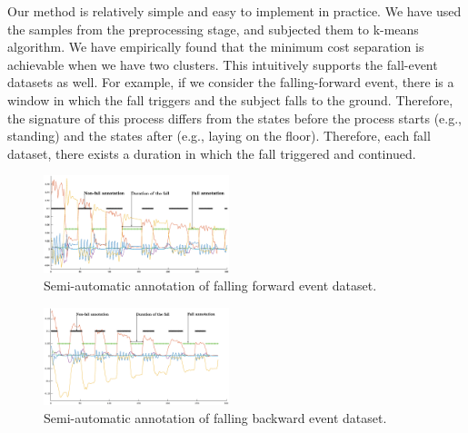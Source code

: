 \documentclass[]{IEEEtran}
\begin{document}
Our method is relatively simple and easy to implement in practice. We have used the 
samples from the preprocessing stage, and subjected them to k-means algorithm. We have empirically found that the minimum cost separation is 
achievable when we have two clusters. This intuitively supports the fall-event datasets 
as well. For 
example, if we consider the falling-forward event, there is a window in which the fall 
triggers and the subject falls to the ground. Therefore, the signature of this process 
differs from the states before the process starts (e.g., standing) and the states after 
(e.g., laying on the floor). Therefore, each fall dataset, there exists a duration in 
which the fall triggered and continued.


\begin{figure}[!htb]
\centering
\includegraphics[width=0.48\textwidth]{plots/human_falling_forward2.eps} 
\caption{Semi-automatic annotation of falling forward event dataset.}
 \label{fig:automatic_annotation} 
\end{figure}


\begin{figure}[!htb]
\centering
\includegraphics[width=0.48\textwidth]{plots/human_falling_backward2.eps} 
\caption{Semi-automatic annotation of falling backward event dataset.}
 \label{fig:automatic_annotation2} 
\end{figure}





\end{document}

